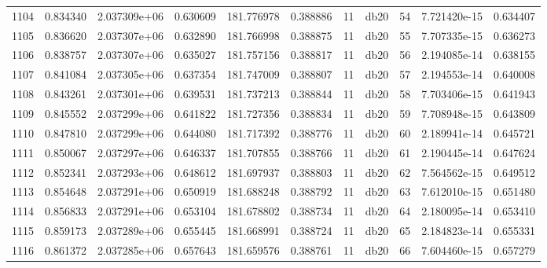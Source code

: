 \begin{tabular}{lrrrrrrlrrr}
1104 &    0.834340 &        2.037309e+06 &  0.630609 &              181.776978 &    0.388886 &      11 &         db20 &     54 &   7.721420e-15 &      0.634407 \\
1105 &    0.836620 &        2.037307e+06 &  0.632890 &              181.766998 &    0.388875 &      11 &         db20 &     55 &   7.707335e-15 &      0.636273 \\
1106 &    0.838757 &        2.037307e+06 &  0.635027 &              181.757156 &    0.388817 &      11 &         db20 &     56 &   2.194085e-14 &      0.638155 \\
1107 &    0.841084 &        2.037305e+06 &  0.637354 &              181.747009 &    0.388807 &      11 &         db20 &     57 &   2.194553e-14 &      0.640008 \\
1108 &    0.843261 &        2.037301e+06 &  0.639531 &              181.737213 &    0.388844 &      11 &         db20 &     58 &   7.703406e-15 &      0.641943 \\
1109 &    0.845552 &        2.037299e+06 &  0.641822 &              181.727356 &    0.388834 &      11 &         db20 &     59 &   7.708948e-15 &      0.643809 \\
1110 &    0.847810 &        2.037299e+06 &  0.644080 &              181.717392 &    0.388776 &      11 &         db20 &     60 &   2.189941e-14 &      0.645721 \\
1111 &    0.850067 &        2.037297e+06 &  0.646337 &              181.707855 &    0.388766 &      11 &         db20 &     61 &   2.190445e-14 &      0.647624 \\
1112 &    0.852341 &        2.037293e+06 &  0.648612 &              181.697937 &    0.388803 &      11 &         db20 &     62 &   7.564562e-15 &      0.649512 \\
1113 &    0.854648 &        2.037291e+06 &  0.650919 &              181.688248 &    0.388792 &      11 &         db20 &     63 &   7.612010e-15 &      0.651480 \\
1114 &    0.856833 &        2.037291e+06 &  0.653104 &              181.678802 &    0.388734 &      11 &         db20 &     64 &   2.180095e-14 &      0.653410 \\
1115 &    0.859173 &        2.037289e+06 &  0.655445 &              181.668991 &    0.388724 &      11 &         db20 &     65 &   2.184823e-14 &      0.655331 \\
1116 &    0.861372 &        2.037285e+06 &  0.657643 &              181.659576 &    0.388761 &      11 &         db20 &     66 &   7.604460e-15 &      0.657279 \\

\end{tabular}
